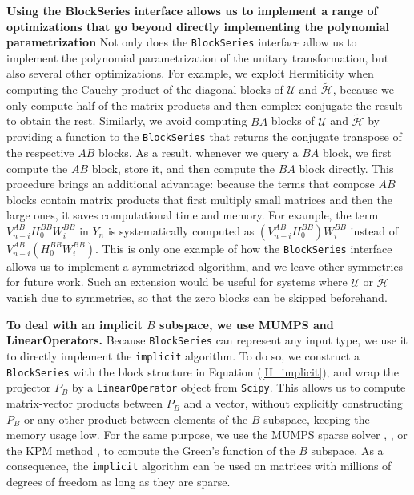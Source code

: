 \textbf{Using the BlockSeries interface allows us to implement a range of
optimizations that go beyond directly implementing the polynomial
parametrization}
Not only does the \texttt{BlockSeries} interface allow us to implement the polynomial
parametrization of the unitary transformation, but also several other
optimizations.
For example, we exploit Hermiticity when computing the Cauchy product of the
diagonal blocks of $\mathcal{U}$ and $\tilde{\mathcal{H}}$, because we only
compute half of the matrix products and then complex conjugate the result to
obtain the rest.
Similarly, we avoid computing $BA$ blocks of $\mathcal{U}$ and
$\tilde{\mathcal{H}}$ by providing a function to the \texttt{BlockSeries} that returns
the conjugate transpose of the respective $AB$ blocks.
As a result, whenever we query a $BA$ block, we first compute the $AB$ block,
store it, and then compute the $BA$ block directly.
This procedure brings an additional advantage: because the terms that compose
$AB$ blocks contain matrix products that first multiply small matrices and then
the large ones, it saves computational time and memory.
For example, the term $V_{n -i}^{AB} H_0^{BB}
W_i^{BB}$ in $Y_n$ is systematically computed as $(V_{n -i}^{AB}
H_0^{BB}) W_i^{BB}$ instead of $V_{n -i}^{AB}
(H_0^{BB} W_i^{BB})$.
This is only one example of how the \texttt{BlockSeries} interface allows us to
implement a symmetrized algorithm, and we leave other symmetries for future
work.
Such an extension would be useful for systems where $\mathcal{U}$ or
$\tilde{\mathcal{H}}$ vanish due to symmetries, so that the zero blocks can be
skipped beforehand.

\textbf{To deal with an implicit $B$ subspace, we use MUMPS and LinearOperators.}
Because \texttt{BlockSeries} can represent any input type, we use it to directly
implement the \texttt{implicit} algorithm.
To do so, we construct a \texttt{BlockSeries} with the block structure in Equation
(\ref{H_implicit}), and wrap the projector $P_B$ by a \texttt{LinearOperator} object
from \texttt{Scipy}.
This allows us to compute matrix-vector products between $P_B$ and a vector,
without explicitly constructing $P_B$ or any other product between elements of
the $B$ subspace, keeping the memory usage low.
For the same purpose, we use the MUMPS sparse solver
\cite{Amestoy_2001},
\cite{Amestoy_2006}, or the KPM method
\cite{Wei_e_2006}, to compute the Green's function of the
$B$ subspace.
As a consequence, the \texttt{implicit} algorithm can be used on matrices with
millions of degrees of freedom as long as they are sparse.

